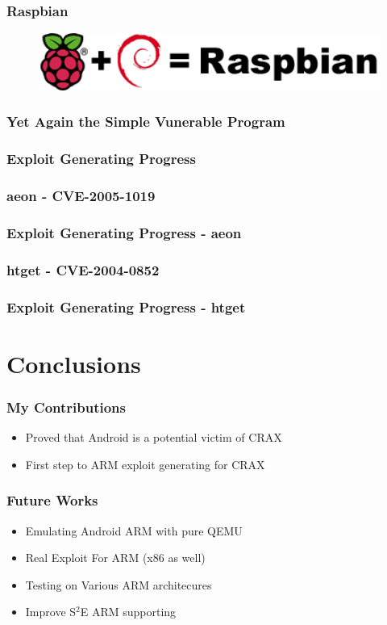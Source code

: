 \documentclass[t,xcolor=table,usenames,dvipsnames]{beamer}
\begin{document}
\begin{frame}
    \frametitle{Raspbian}
    \begin{figure}
    \includegraphics[width=1.0\textwidth]{img/raspbian_logo.png}
    \end{figure}
\end{frame}

\begin{frame}
    \frametitle{Yet Again the Simple Vunerable Program}
    
\end{frame}

\begin{frame}
    \frametitle{Exploit Generating Progress}
    
\end{frame}

\begin{frame}
    \frametitle{aeon - CVE-2005-1019}
    
\end{frame}

\begin{frame}
    \frametitle{Exploit Generating Progress - aeon}
    
\end{frame}

\begin{frame}
    \frametitle{htget - CVE-2004-0852}
    
\end{frame}

\begin{frame}
    \frametitle{Exploit Generating Progress - htget}
    
\end{frame}

\section{Conclusions}
\begin{frame}
    \sectionpage
\end{frame}

\begin{frame}
    \frametitle{My Contributions}
    \begin{itemize}
        \item{Proved that Android is a potential victim of CRAX}
        \item{First step to ARM exploit generating for CRAX}
    \end{itemize}
\end{frame}

\begin{frame}
    \frametitle{Future Works}
    \begin{itemize}
        \item{Emulating Android ARM with pure QEMU}
        \item{Real Exploit For ARM (x86 as well)}
        \item{Testing on Various ARM architecures}
        \item{Improve S$^{2}$E ARM supporting}
    \end{itemize}
\end{frame}
\end{document}
